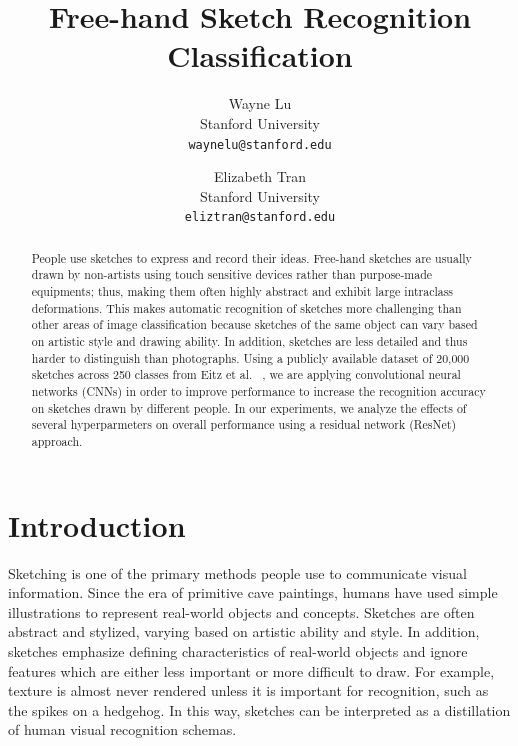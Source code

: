 \documentclass[10pt,twocolumn,letterpaper]{article}
\begin{document}
\title{Free-hand Sketch Recognition Classification}

\author{Wayne Lu\\
Stanford University \\
{\tt\small waynelu@stanford.edu}
\and
Elizabeth Tran\\
Stanford University\\
{\tt\small eliztran@stanford.edu}
}

\maketitle

\begin{abstract}

People use sketches to express and record their ideas. Free-hand sketches are usually drawn by non-artists using touch sensitive devices rather than purpose-made equipments; thus, making them often highly abstract and exhibit large intraclass deformations. This makes automatic recognition of sketches more challenging than other areas of image classification because sketches of the same object can vary based on artistic style and drawing ability. In addition, sketches are less detailed and thus harder to distinguish than photographs. Using a publicly available dataset of 20,000 sketches across 250 classes from Eitz et al. ~\cite{eitz2012hdhso}, we are applying convolutional neural networks (CNNs) in order to improve performance to increase the recognition accuracy on sketches drawn by different people. In our experiments, we analyze the effects of several hyperparmeters on overall performance using a residual network (ResNet) approach.  
 
\end{abstract}

\section{Introduction}
Sketching is one of the primary methods people use to communicate visual information. Since the era of primitive cave paintings, humans have used simple illustrations to represent real-world objects and concepts. Sketches are often abstract and stylized, varying based on artistic ability and style. In addition, sketches emphasize defining characteristics of real-world objects and ignore features which are either less important or more difficult to draw. For example, texture is almost never rendered unless it is important for recognition, such as the spikes on a hedgehog. In this way, sketches can be interpreted as a distillation of human visual recognition schemas.
\end{document}
